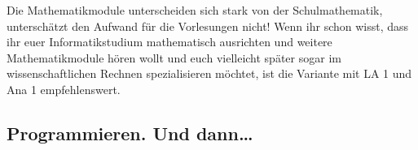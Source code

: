 Die Mathematikmodule unterscheiden sich stark von der Schulmathematik, unterschätzt den Aufwand für die Vorlesungen nicht! Wenn ihr schon wisst, dass ihr euer Informatikstudium mathematisch ausrichten und weitere Mathematikmodule hören wollt und euch vielleicht später sogar im wissenschaftlichen Rechnen spezialisieren möchtet, ist die Variante mit LA 1 und Ana 1 empfehlenswert.

\subsection{Programmieren. Und dann\dots}


